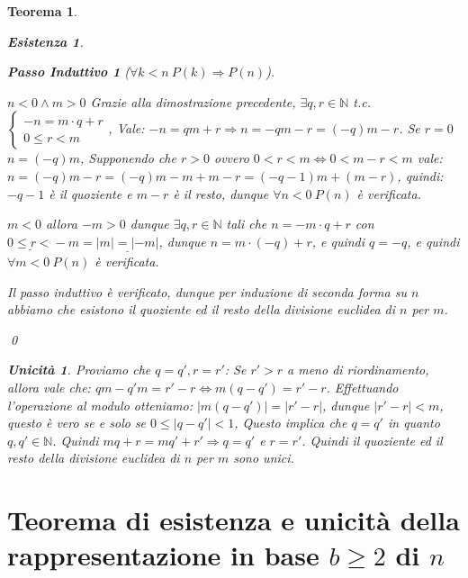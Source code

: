 \documentclass{article}
\makeatletter
\renewenvironment{proof}[1][\proofname]{\par
    \pushQED{\qed}%
    \normalfont \topsep6\p@\@plus6\p@\relax
    \trivlist
    \item\relax
    {\itshape
    #1\@addpunct{.}}\hspace\labelsep\ignorespaces
    }{%
    \popQED\endtrivlist\@endpefalse
}
\newtheorem{theorem}{Teorema}[part]
\theoremstyle{definition}
\newtheorem*{existence}{Esistenza}
\newtheorem*{uniqueness}{Unicità}
\newtheorem*{step}{Passo Induttivo}
\newcommand{\N}{\mathbb{N}}
\makeatother
\begin{document}
\begin{theorem}
\begin{proof}
\begin{existence}
\begin{step}[$\forall k<n\ P(k)\Rightarrow P(n)$]
\begin{list}{\leftmargin=1.5em}
                    \item{\(n<0\land m>0\)} Grazie alla dimostrazione precedente, \(\exists q,r\in\N\) t.c. \(\begin{cases}-n=m\cdot q+r\\0\leq r<m\end{cases}\), Vale: \(-n=qm+r\Rightarrow n=-qm-r=(-q)m-r\). Se \(r=0\) \(n=(-q)m\), Supponendo che \(r>0\) ovvero \(0<r<m\Leftrightarrow 0<m-r<m\) vale: \(n=(-q)m-r=(-q)m-m+m-r=(-q-1)m+(m-r)\), quindi: \(-q-1\) è il quoziente e \(m-r\) è il resto, dunque \(\forall n<0\ P(n)\) è verificata.
                    \item{\(m<0\)} allora \(-m>0\) dunque \(\exists q,r \in\mathbb{N}\) tali che \(n=-m\cdot q+r\) con \(\underline{0\leq r<}-m=\underline{|m|=|-m|}\), dunque \(n=m\cdot (-q)+r\), e quindi \(q=-q\), e quindi \(\forall m<0\ P(n)\) è verificata.
                \end{list}
            \end{step}
            Il passo induttivo è verificato, dunque per induzione di seconda forma su \(n\) abbiamo che esistono il quoziente ed il resto della divisione euclidea di \(n\) per \(m\).
        \end{existence} 
        \qed
        \begin{uniqueness}
            Proviamo che \(q=q', r=r'\):
            Se \(r'>r\) a meno di riordinamento, allora vale che: \(qm-q'm=r'-r\Leftrightarrow m(q-q')=r'-r\).
            Effettuando l'operazione al modulo otteniamo: \(|m(q-q')|=|r'-r|\), dunque \(|r'-r|<m\), questo è vero se e solo se \(0\leq|q-q'|<1\),
            Questo implica che \(q=q'\) in quanto \(q,q'\in\mathbb{N}\).
            Quindi \(mq+r=mq'+r'\Rightarrow q=q'\) e \(r=r'\).
            Quindi il quoziente ed il resto della divisione euclidea di \(n\) per \(m\) sono unici.
        \end{uniqueness}
        \raggedleft{\pushQED{\ensuremath{\blacksquare}}}
    \end{proof}
\end{theorem}
\part{Teorema di esistenza e unicità della rappresentazione in base \texorpdfstring{\(b\geq 2\)}{b>=2} di \texorpdfstring{\(n\)}{n}}
\end{document}
